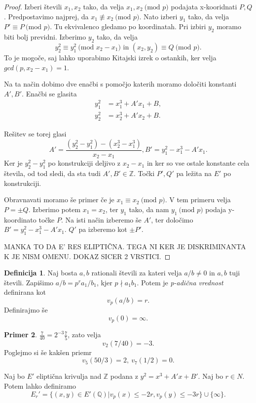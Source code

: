 \documentclass[12pt,a4paper,twoside]{article}
\theoremstyle{definition} %
\newtheorem{definicija}{Definicija}[section]
\newtheorem{primer}[definicija]{Primer}
\theoremstyle{plain} %
\numberwithin{equation}{section}  %
\newcommand{\Z}{\mathbb Z}
\newcommand{\Q}{\mathbb Q}
\newcommand{\MOD}[1]{\ \text{(mod }{#1}\text{)}}
\begin{document}
\begin{proof}

Izberi števili $x_1,x_2$ tako, da velja $x_1,x_2 \MOD{p}$ podajata x-kooridnati $P,Q$. Predpostavimo najprej, da $x_1 \not \equiv x_2 \MOD{p}$. Nato izberi $y_1$ tako, da velja
$P' \equiv P \MOD{p}$. Tu ekvivalenco gledamo po koordinatah. Pri izbiri $y_2$ moramo biti bolj previdni. Izberimo $y_2$ tako, da velja
$$y_2^2\equiv y_1^2 \MOD{x_2-x_1} \text{ in } (x_2,y_2) \equiv Q \MOD{p}.$$
To je mogoče, saj lahko uporabimo Kitajski izrek o ostankih, ker velja $gcd(p,x_2-x_1) = 1$.

Na ta način dobimo dve enačbi s pomočjo katerih moramo določiti konstanti $A',B'$.
Enačbi se glasita
\begin{align}
y_1^2&{}=x_1^3+A'x_1+B, \nonumber  \\
y_2^2&{}=x_2^3+A'x_2+B. \nonumber
\end{align}

Rešitev se torej glasi
$$A' = \frac{(y_2^2-y_1^2)-(x_2^3-x_1^3)}{x_2-x_1}, B' = y_1^2-x_1^3-A'x_1.$$
Ker je $y_2^2-y_1^2$ po konstrukciji deljivo z $x_2-x_1$ in ker so vse ostale konstante cela števila, od tod sledi, da sta tudi $A',B' \in \Z$. Točki $P',Q'$ pa ležita na $E'$ po konstrukciji.

Obravnavati moramo še primer če je $x_1 \equiv x_2 \MOD{p}$. V tem primeru velja $P = \pm Q$. Izberimo potem $x_1 = x_2$, ter $y_1$ tako, da nam $y_1 \MOD{p}$ podaja y-koordinato točke $P$. Na isti način izberemo še $A'$, ter določimo $B' = y_1^2-x_1^3-A'x_1$. $Q'$ pa izberemo kot $\pm P'$.

MANKA TO DA E' RES ELIPTIČNA. TEGA NI KER JE DISKRIMINANTA K JE NISM OMENU. DOKAZ SICER 2 VRSTICI.
\end{proof}


\begin{definicija}

Naj bosta $a,b$ rationali števili za kateri velja $a/b \neq 0$ in $a,b$ tuji števili. Zapišimo $a/b = p^ra_1/b_1$, kjer $p \nmid a_1b_1$. Potem je \emph{p-adična vrednost} definirana
kot
$$v_p(a/b) = r.$$
Definirajmo še
$$v_p(0) = \infty.$$
\end{definicija}

\begin{primer}

$\frac{7}{40} = 2^{-3}\frac{7}{5}$, zato velja
$$v_2(7/40) = -3.$$
Poglejmo si še kakšen priemr
$$v_5(50/3) = 2,\ v_7(1/2) = 0.$$
\end{primer}

Naj bo $E'$ eliptična krivulja nad $\Z$ podana z $y^2 = x^3+A'x+B'$. Naj bo $r \in N$. Potem lahko definiramo
$$E_r' = \{  (x,y) \in E'(\Q) | v_p(x) \leq -2r, v_p(y) \leq -3r \} \cup \{ \infty \}.$$
\end{document}
